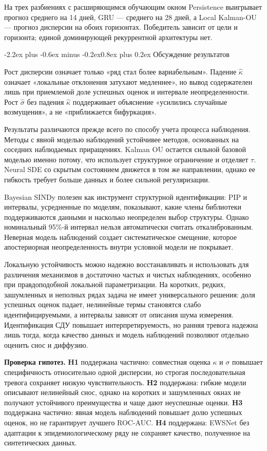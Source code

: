 \documentclass[12pt,a4paper]{article}
\makeatletter
\numberwithin{table}{section}
\numberwithin{figure}{section}
\renewcommand\subsection{\@startsection{subsection}{2}{0pt}
  {-2.2ex plus -0.6ex minus -0.2ex}{0.8ex plus 0.2ex}
  {\normalfont\normalsize\bfseries}}
\makeatother
\begin{document}
На трех разбиениях с расширяющимся обучающим окном Persistence выигрывает
прогноз среднего на 14 дней, GRU --- среднего на 28 дней, а Local Kalman-OU ---
прогноз дисперсии на обоих
горизонтах. Победитель зависит от цели и горизонта; единой доминирующей
рекуррентной архитектуры нет.

\subsection{Обсуждение результатов}

Рост дисперсии означает только «ряд стал более вариабельным». Падение
$\widehat\kappa$ означает «локальные отклонения затухают медленнее», но вывод
содержателен лишь при приемлемой доле успешных оценок и интервале неопределенности.
Рост $\widehat\sigma$ без падения $\widehat\kappa$ поддерживает объяснение
«усилились случайные возмущения», а не «приближается бифуркация».

Результаты различаются прежде всего по способу учета процесса наблюдения.
Методы с явной моделью наблюдений устойчивее методов, основанных на соседних
наблюдаемых приращениях. Kalman OU остается
сильной базовой моделью именно потому, что использует структурное ограничение
и отделяет $\tau$. Neural SDE со скрытым состоянием движется в том же
направлении, однако ее гибкость требует больше данных и более сильной
регуляризации.

Bayesian SINDy полезен как инструмент структурной идентификации: PIP и
интервалы, усредненные по моделям, показывают, какие члены библиотеки
поддерживаются данными и насколько неопределен выбор структуры. Однако
номинальный 95\%-й интервал нельзя автоматически считать откалиброванным.
Неверная модель наблюдений создает систематическое смещение, которое
апостериорная неопределенность внутри условной модели не покрывает.

Локальную устойчивость можно надежно восстанавливать и использовать для
различения механизмов в достаточно частых и чистых наблюдениях, особенно при
правдоподобной локальной параметризации. На коротких, редких, зашумленных и
неполных рядах задача не имеет универсального решения: доля успешных оценок падает,
нелинейные термы становятся слабо идентифицируемыми, а интервалы зависят от
описания шума измерения. Идентификация СДУ повышает интерпретируемость, но
ранняя тревога надежна лишь тогда, когда
качество данных и модель наблюдений позволяют отдельно оценить снос и
диффузию.

\textbf{Проверка гипотез.} \textbf{H1} поддержана частично: совместная оценка
$\kappa$ и $\sigma$ повышает специфичность относительно одной дисперсии, но
строгая последовательная тревога сохраняет низкую чувствительность.
\textbf{H2} поддержана: гибкие модели описывают нелинейный снос, однако на
коротких и зашумленных окнах не получают устойчивого преимущества и чаще дают
неуспешные оценки. \textbf{H3} поддержана частично: явная модель наблюдений
повышает долю успешных оценок, но не гарантирует лучшего ROC-AUC.
\textbf{H4} поддержана: EWSNet без адаптации к эпидемиологическому ряду не
сохраняет качество, полученное на синтетических данных.
\end{document}
